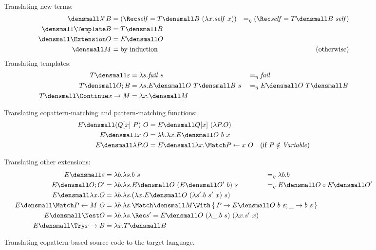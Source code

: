 \begin{figure}[t]
\centering
\small
Translating new terms:  
\begin{align*}
  \den{\lamstar B}
  &=
  (\Rec \mathit{self} = T\den{B} ~ (\lambda x. \mathit{self} ~ x))
  &=_\eta
  (\Rec \mathit{self} = T\den{B} ~ \mathit{self})
  \\
  \den{\Template B}
  &=
  T\den{B}
  \\
  \den{\Extension O}
  &=
  E\den{O}
  \\
  \den{M}
  &=
  \text{by induction}
  &(\text{otherwise})
\end{align*}
Translating templates:
\begin{align*}
  T\den{\varepsilon}
  &=
  \lambda s. \mathit{fail}~s
  &
  &=_\eta
  \mathit{fail}
  \\
  T\den{O; B}
  &=
  \lambda s. E\den{O} ~ T\den{B} ~ s
  &
  &=_\eta
  E\den{O} ~ T\den{B}
  \\
  T\den{\Continue x \to M}
  &=
  \lambda x. \den{M}
\end{align*}

Translating copattern-matching and pattern-matching functions:
\begin{align*}
  E\den{(Q[x] ~ P) ~ O}
  &=
  E\den{Q[x] ~ (\lambda P. O)}
  \\
  E\den{x ~ O}
  &=
  \lambda b. \lambda x. E\den{O} ~ b ~ x
  \\
  E\den{\lambda P. O}
  &=
  E\den{\lambda x. \Match P \gets x ~ O}
  &(\text{if } P \notin \mathit{Variable})
\end{align*}

Translating other extensions:
\begin{align*}
  E\den{\varepsilon}
  &=
  \lambda b. \lambda s. b ~ s
  &
  &=_\eta
  \lambda b. b
  \\
  E\den{O; O'}
  &=
  \lambda b. \lambda s. E\den{O} ~ (E\den{O'}~b) ~ s
  &
  &=_\eta
  E\den{O} \comp E\den{O'}
  \\
  E\den{\lambda x. O}
  &=
  \lambda b. \lambda s. (\lambda x. E\den{O} ~ (\lambda s'. b ~ s' ~ x) ~ s)
  \\
  E\den{\Match P \gets M ~ O}
  &=
  \rlap{$
    \lambda b. \lambda s.
    \Match \den{M} \With \set{P \to E\den{O}~b~s; \_ \to b~s}
  $}
  \\
  E\den{\Nest O}
  &=
  \lambda b. \lambda s. \Rec s' = E\den{O} ~ (\lambda \_. b ~ s) ~ (\lambda x. s' ~ x)
  \\
  E\den{\Try x \to B}
  &=
  \lambda x. T\den{B}
\end{align*}
\caption{Translating copattern-based source code to the target language.}
\label{fig:translation}
\end{figure}

